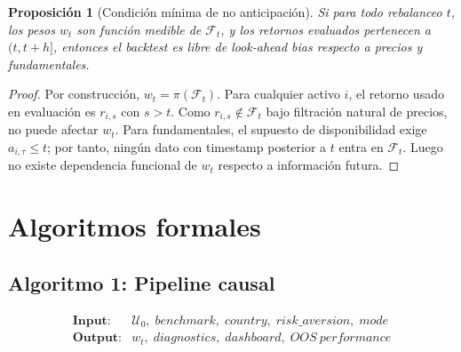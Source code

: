 \documentclass[11pt,letterpaper]{article}
\newtheorem{proposition}{Proposición}
\newcommand{\F}{\mathcal{F}}
\newcommand{\1}{\mathbf{1}}
\begin{document}
\begin{proposition}[Condición mínima de no anticipación]
Si para todo rebalanceo \(t\), los pesos \(w_t\) son función medible de \(\F_t\), y los retornos evaluados pertenecen a \((t,t+h]\), entonces el backtest es libre de look-ahead bias respecto a precios y fundamentales.
\end{proposition}

\begin{proof}
Por construcción, \(w_t=\pi(\F_t)\). Para cualquier activo \(i\), el retorno usado en evaluación es \(r_{i,s}\) con \(s>t\). Como \(r_{i,s}\notin\F_t\) bajo filtración natural de precios, no puede afectar \(w_t\). Para fundamentales, el supuesto de disponibilidad exige \(a_{i,\tau}\le t\); por tanto, ningún dato con timestamp posterior a \(t\) entra en \(\F_t\). Luego no existe dependencia funcional de \(w_t\) respecto a información futura.
\end{proof}

\newpage
\section{Algoritmos formales}

\subsection{Algoritmo 1: Pipeline causal}

\[
\begin{array}{ll}
\textbf{Input:} & \mathcal{U}_0,\; benchmark,\; country,\; risk\_aversion,\; mode \\
\textbf{Output:} & w_t,\; diagnostics,\; dashboard,\; OOS\ performance
\end{array}
\]
\end{document}
